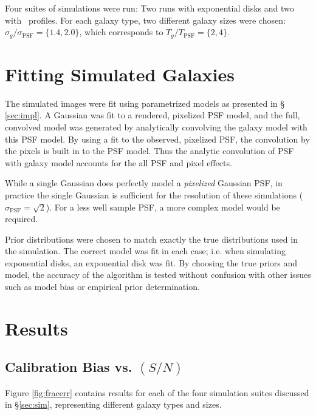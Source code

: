 \documentclass[12pt,preprint]{aastex}
\newcommand{\sn}{$(S/N)$}
\begin{document}
Four suites of simulations were run:  Two runs with exponential disks and two
with \devauc\ profiles.  For each galaxy type, two different galaxy sizes were
chosen: $\sigma_{g}/\sigma_{\textrm{PSF}} = \{1.4,2.0\}$, which corresponds to
$T_{g}/T_{\textrm{PSF}} =\{2,4\}$.


\section{Fitting Simulated Galaxies} \label{sec:simfit}

The simulated images were fit using parametrized models as presented in \S
\ref{sec:impl}.   A Gaussian was fit to a rendered, pixelized PSF model, and
the full, convolved model was generated by analytically convolving the galaxy
model with this PSF model. By using a fit to the observed, pixelized PSF, the
convolution by the pixels is built in to the PSF model. Thus the analytic
convolution of PSF with galaxy model accounts for the all PSF and pixel
effects.  

While a single Gaussian does perfectly model a {\it pixelized} Gaussian PSF, in
practice the single Gaussian is sufficient for the resolution of these
simulations ($\sigma_{\textrm{PSF}}=\sqrt{2}$).  For a less well sample PSF, a
more complex model would be required.

Prior distributions were chosen to match exactly the true distributions used in
the simulation.  The correct model was fit in each case; i.e. when simulating
exponential disks, an exponential disk was fit.  By choosing the true priors
and model, the accuracy of the algorithm is tested without confusion with other
issues such as model bias or empirical prior determination.

\section{Results} \label{sec:results}

\subsection{Calibration Bias vs. \sn} \label{sec:snbias}

Figure \ref{fig:fracerr} contains results for each of the four simulation
suites discussed in \S \ref{sec:sim}, representing different galaxy types and
sizes. 
\end{document}
